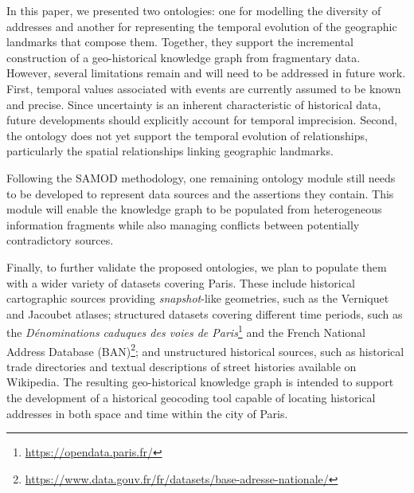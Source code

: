 In this paper, we presented two ontologies: one for modelling the diversity of addresses and another for representing the temporal evolution of the geographic landmarks that compose them. Together, they support the incremental construction of a geo-historical knowledge graph from fragmentary data. However, several limitations remain and will need to be addressed in future work. First, temporal values associated with events are currently assumed to be known and precise. Since uncertainty is an inherent characteristic of historical data, future developments should explicitly account for temporal imprecision. Second, the ontology does not yet support the temporal evolution of relationships, particularly the spatial relationships linking geographic landmarks.

Following the SAMOD methodology, one remaining ontology module still needs to be developed to represent data sources and the assertions they contain. This module will enable the knowledge graph to be populated from heterogeneous information fragments while also managing conflicts between potentially contradictory sources.

Finally, to further validate the proposed ontologies, we plan to populate them with a wider variety of datasets covering Paris. These include historical cartographic sources providing \textit{snapshot}-like geometries, such as the Verniquet and Jacoubet atlases; structured datasets covering different time periods, such as the \textit{Dénominations caduques des voies de Paris}\footnote{\url{https://opendata.paris.fr/}} and the French National Address Database (BAN)\footnote{\url{https://www.data.gouv.fr/fr/datasets/base-adresse-nationale/}}; and unstructured historical sources, such as historical trade directories and textual descriptions of street histories available on Wikipedia. The resulting geo-historical knowledge graph is intended to support the development of a historical geocoding tool capable of locating historical addresses in both space and time within the city of Paris.